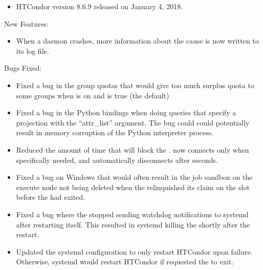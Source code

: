 \begin{itemize}

\item HTCondor version 8.6.9 released on January 4, 2018.

\end{itemize}


\noindent New Features:

\begin{itemize}

\item When a daemon crashes, more information about the cause is now
written to its log file.

\end{itemize}

\noindent Bugs Fixed:

\begin{itemize}

\item Fixed a bug in the group quotas that would give too much surplus
quota to some groups when  is on and
 is true (the default)

\item Fixed a bug in the Python bindings when doing queries that specify a
projection with the ``attr\_list'' argument. The bug could could
potentially result in memory corruption of the Python interpreter process.

\item Reduced the amount of time that  will block the
.
 now connects only when specifically needed,
and automatically disconnects after
 seconds.

\item Fixed a bug on Windows that would often result in the job sandbox
on the execute node not being deleted when the  relinquished
its claim on the slot before the  had exited.

\item Fixed a bug where the  stopped sending watchdog
notifications to systemd after restarting itself.
This resulted in systemd killing the  shortly after
the restart.

\item Updated the systemd configuration to only restart HTCondor upon
failure. Otherwise, systemd would restart HTCondor if 
requested the  to exit.


\end{itemize}
